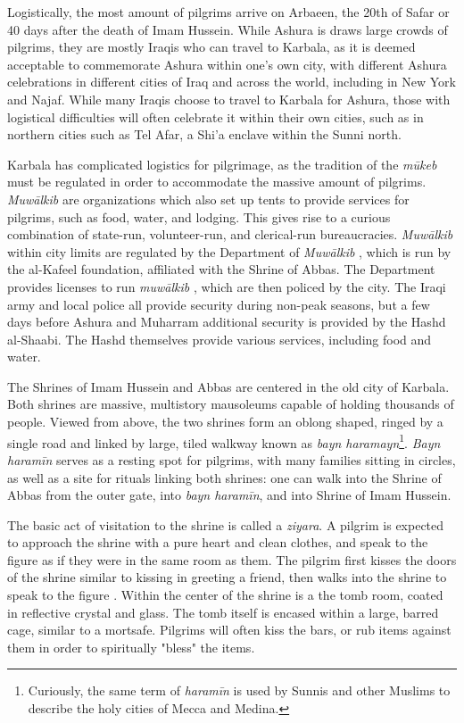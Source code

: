 Logistically, the most amount of pilgrims arrive on Arbaeen, the 20th of Safar or 40 days after the death of Imam Hussein. While Ashura is draws large crowds of pilgrims, they are mostly Iraqis who can travel to Karbala, as it is deemed acceptable to commemorate Ashura within one’s own city, with different Ashura celebrations in different cities of Iraq and across the world, including in New York and Najaf. While many Iraqis choose to travel to Karbala for Ashura, those with logistical difficulties will often celebrate it within their own cities, such as in northern cities such as Tel Afar, a Shi'a enclave within the Sunni north.  

Karbala has complicated logistics for pilgrimage, as the tradition of the \emph{mūkeb} must be regulated in order to accommodate the massive amount of pilgrims. \emph{Muwālkib}  are organizations which also set up tents to provide services for pilgrims, such as food, water, and lodging. This gives rise to a curious combination of state-run, volunteer-run, and clerical-run bureaucracies. \emph{Muwālkib}  within city limits are regulated by the Department of \emph{Muwālkib} , which is run by the al-Kafeel foundation, affiliated with the Shrine of Abbas. The Department provides licenses to run \emph{muwālkib} , which are then policed by the city. The Iraqi army and local police all provide security during non-peak seasons, but a few days before Ashura and Muharram additional security is provided by the Hashd al-Shaabi. The Hashd themselves provide various services, including food and water.

The Shrines of Imam Hussein and Abbas are centered in the old city of Karbala. Both shrines are massive, multistory mausoleums capable of holding thousands of people. Viewed from above, the two shrines form an oblong shaped, ringed by a single road and linked by large, tiled walkway known as \emph{bayn haramayn}\footnote{Curiously, the same term of \emph{haramīn} is used by Sunnis and other Muslims to describe the holy cities of Mecca and Medina.}. \emph{Bayn haramīn} serves as a resting spot for pilgrims, with many families sitting in circles, as well as a site for rituals linking both shrines: one can walk into the Shrine of Abbas from the outer gate, into \emph{bayn haramīn}, and into Shrine of Imam Hussein. 

The basic act of visitation to the shrine is called a \emph{ziyara}. A pilgrim is expected to approach the shrine with a pure heart and clean clothes, and speak to the figure as if they were in the same room as them. The pilgrim first kisses the doors of the shrine similar to kissing in greeting a friend, then walks into the shrine to speak to the figure \cite{qisa_publications_illustrated_2018}. Within the center of the shrine is a the tomb room, coated in reflective crystal and glass. The tomb itself is encased within a large, barred cage, similar to a mortsafe. Pilgrims will often kiss the bars, or rub items against them in order to spiritually "bless" the items. 

